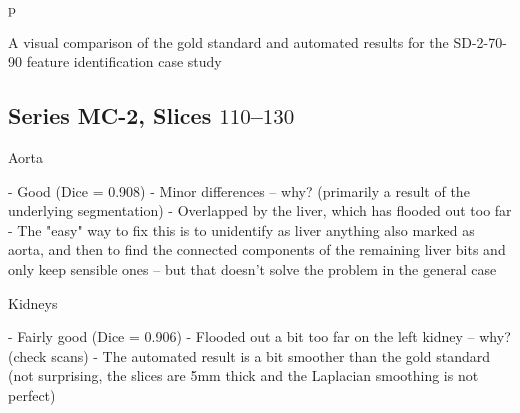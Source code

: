 \begin{stusubfig}{p}
	\hspace{4mm}%
\caption{A visual comparison of the gold standard and automated results for the SD-2-70-90 feature identification case study}
\label{fig:validation-SD-2-70-90}
\end{stusubfig}

\afterpage{\clearpage}
\newpage

\subsection{Series MC-2, Slices $110$--$130$}

\iffalse

Aorta

- Good (Dice = 0.908)
- Minor differences -- why? (primarily a result of the underlying segmentation)
- Overlapped by the liver, which has flooded out too far
  - The "easy" way to fix this is to unidentify as liver anything also marked as aorta, and then to find the connected components of the remaining liver bits and only keep sensible ones -- but that doesn't solve the problem in the general case

Kidneys

- Fairly good (Dice = 0.906)
- Flooded out a bit too far on the left kidney -- why? (check scans)
- The automated result is a bit smoother than the gold standard (not surprising, the slices are 5mm thick and the Laplacian smoothing is not perfect)

